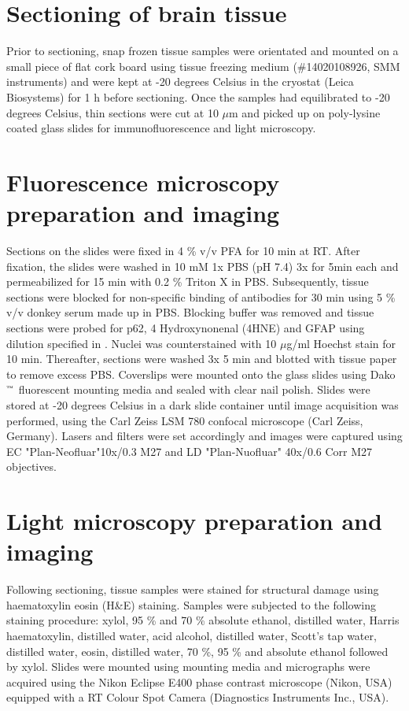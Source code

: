 \section{Sectioning of brain tissue}
Prior to sectioning, snap frozen tissue samples were orientated and mounted on a small piece of flat cork board using tissue freezing medium (\#14020108926, SMM instruments) and were kept at -20 degrees Celsius in the cryostat (Leica Biosystems) for 1 h before sectioning. Once the samples had equilibrated to -20 degrees Celsius, thin sections were cut at 10 $\mu$m and picked up on poly-lysine coated glass slides for immunofluorescence and light microscopy.

\section{Fluorescence microscopy preparation and imaging}
Sections on the slides were fixed in 4 \% v/v PFA for 10 min at RT. After fixation, the slides were washed in 10 mM 1x PBS (pH 7.4) 3x for 5min each and permeabilized for 15 min with 0.2 \% Triton X in PBS. Subsequently, tissue sections were blocked for non-specific binding of antibodies for 30 min using 5 \% v/v donkey serum made up in PBS. Blocking buffer was removed and tissue sections were probed for p62, 4 Hydroxynonenal (4HNE) and GFAP using dilution specified in . Nuclei was counterstained with 10 $\mu$g/ml Hoechst stain for 10 min. Thereafter, sections were washed 3x 5 min and blotted with tissue paper to remove excess PBS. Coverslips were mounted onto the glass slides using Dako${\textsuperscript{\tiny{\texttrademark}}}$ fluorescent mounting media and sealed with clear nail polish. Slides were stored at -20 degrees Celsius in a dark slide container until image acquisition was performed, using the Carl Zeiss LSM 780 confocal microscope (Carl Zeiss, Germany). Lasers and filters were set accordingly and images were captured using EC "Plan-Neofluar"10x/0.3 M27 and LD "Plan-Nuofluar" 40x/0.6 Corr M27 objectives.

\section{Light microscopy preparation and imaging}
Following sectioning, tissue samples were stained for structural damage using haematoxylin eosin (H\&E) staining. Samples were subjected to the following staining procedure: xylol, 95 \% and 70 \% absolute ethanol, distilled water, Harris haematoxylin, distilled water, acid alcohol, distilled water, Scott's tap water, distilled water, eosin, distilled water, 70 \%, 95 \% and absolute ethanol followed by xylol. Slides were mounted using mounting media and micrographs were acquired using the Nikon Eclipse E400 phase contrast microscope (Nikon, USA) equipped with a RT Colour Spot Camera (Diagnostics Instruments Inc., USA). 

